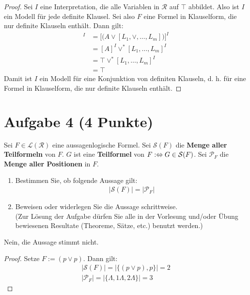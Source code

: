 \documentclass[12pt,a4paper]{article}
\renewcommand{\L}{\mathcal{L}} %
\newcommand{\RR}{\mathcal{R}} %
\newcommand{\PP}{\mathcal{P}} %
\renewcommand{\S}{\mathcal{S}} %
\begin{document}
\begin{proof}
Sei $I$ eine Interpretation, die alle Variablen in $\RR$ auf $\top$ abbildet. Also ist $I$ ein Modell für jede definite Klausel.
Sei also $F$ eine Formel in Klauselform, die nur definite Klauseln enthält. Dann gilt:
\begin{align*}
[A,L_1,\ldots,L_m]^I
&=\Big[\big(A\vee[L_1,\vee,\ldots,L_m]\big)\Big]^I\\
&=[A]^I\vee^\ast[L_1,\ldots,L_m]^I\\
&=\top\vee^\ast[L_1,\ldots,L_m]^I\\
&=\top
\end{align*}
Damit ist $I$ ein Modell für eine Konjunktion von definiten Klauseln, d. h. für eine Formel in Klauselform, die nur definite Klauseln enthält.
\end{proof}

\section*{Aufgabe 4 (4 Punkte)}
Sei $F\in\L(\RR)$ eine aussagenlogische Formel. Sei $\S(F)$ die  \textbf{Menge aller Teilformeln} von $F$. $G$ ist eine \textbf{Teilformel} von $F:\gdw G\in \S(F)$. Sei $\mathcal{P}_F$ die \textbf{Menge aller Positionen} in $F$.
\begin{enumerate}
\item Bestimmen Sie, ob folgende Aussage gilt:
\begin{align*}
\big|\S(F)\big|=\big|\PP_F\big|
\end{align*}
\item Beweisen oder widerlegen Sie die Aussage schrittweise.\\
(Zur Lösung der Aufgabe dürfen Sie alle in der Vorlesung und/oder Übung bewiesenen Resultate (Theoreme, Sätze, etc.) benutzt werden.)
\end{enumerate}
\begin{lösung}
Nein, die Aussage stimmt nicht.
\begin{proof}
Setze $F:=(p\vee p)$. Dann gilt:
\begin{align*}
\big|\S(F)\big|=\big|\lbrace(p\vee p),p\rbrace\big|=2\\
\big|\PP_F\big|=\big|\lbrace\Lambda,1\Lambda,2\Lambda\rbrace\big|=3
\end{align*}
\end{proof}
\end{lösung}
\end{document}

